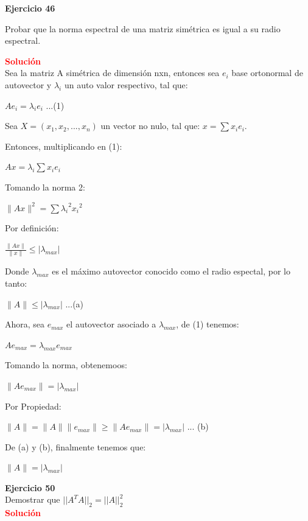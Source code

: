 \documentclass[12pt]{article}
\begin{document}
\noindent \textbf{Ejercicio 46}

Probar que la norma espectral de una matriz simétrica es igual a su radio espectral.

\noindent \textcolor{red}{\bf Solución}\\

Sea la matriz A simétrica de dimensi\'on nxn, entonces sea $e_i$ base ortonormal de autovector y $\lambda_i$  un auto valor respectivo, tal que:
\begin{center}
    $A e_i = \lambda_i e_i$ ...(1)
\end{center}

Sea $X=(x_1, x_2, ..., x_n)$ un vector no nulo, tal que: $x = \sum x_i e_i$. 

Entonces, multiplicando en (1):
\begin{center}
    $Ax = \lambda_i \sum x_i e_i $
\end{center}

Tomando la norma 2:
\begin{center}
    $\|Ax\|^2= \sum {\lambda_i}^2 {x_i}^2 $
\end{center}
Por definici\'on:
\begin{center}
    $\frac{\|Ax\|}{\|x\|} \leq  | \lambda_{max} | $
\end{center}
Donde $\lambda_{max}$ es el m\'aximo autovector conocido como el radio espectal, por lo tanto:
\begin{center}
    $\|A\| \leq  | \lambda_{max} | $ ...(a)
\end{center}
Ahora, sea $e_{max}$ el autovector asociado a $\lambda_{max}$, de (1) tenemos:
\begin{center}
    $A e_{max} = \lambda_{max} e_{max}$
\end{center}
Tomando la norma, obtenemoos:
\begin{center}
    $\|A e_{max}\| = |\lambda_{max}|$
\end{center}
Por Propiedad: 
\begin{center}
    $ \|A\| = \|A\| \|e_{max}\| \geq \|A e_{max}\| = |\lambda_{max}|$ ... (b)
\end{center}
De (a) y (b), finalmente tenemos que:
\begin{center}
    $ \|A\| = |\lambda_{max}|$
\end{center}

\noindent \textbf{Ejercicio 50}\\
Demostrar que ${||{A}^{T}A||}_{2} = {||A||}_{2}^{2}$ \\
\noindent \textcolor{red}{\bf Solución}\\
\end{document}
